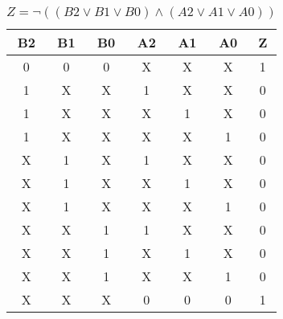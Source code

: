 
\begin{center}
    \begin{table}[h] \caption{\(Z = \lnot ((B2 \lor B1 \lor B0) \land (A2 \lor A1 \lor A0)) \)}
        \begin{center}
            \begin{tabular}{|c|c|c|c|c|c||c|} \hline
            B2 & B1 & B0 & A2 & A1 & A0 & Z \\ \hline\hline
            0  & 0  & 0  & X  & X  & X  & 1\\ \hline
            1  & X  & X  & 1  & X  & X  & 0\\ \hline
            1  & X  & X  & X  & 1  & X  & 0\\ \hline
            1  & X  & X  & X  & X  & 1  & 0\\ \hline
            X  & 1  & X  & 1  & X  & X  & 0\\ \hline
            X  & 1  & X  & X  & 1  & X  & 0\\ \hline
            X  & 1  & X  & X  & X  & 1  & 0\\ \hline
            X  & X  & 1  & 1  & X  & X  & 0\\ \hline
            X  & X  & 1  & X  & 1  & X  & 0\\ \hline
            X  & X  & 1  & X  & X  & 1  & 0\\ \hline
            X  & X  & X  & 0  & 0  & 0  & 1\\ \hline
            \end{tabular}
        \end{center}
    \end{table}
\end{center}
